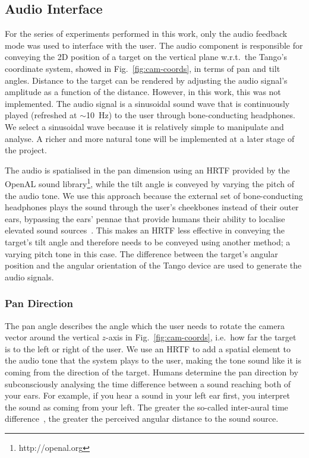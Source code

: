 \documentclass[sigconf, review=true, screen=true, anonymous=true]{acmart}
\begin{document}
\subsection{Audio Interface}

For the series of experiments performed in this work, only the audio feedback mode was used to interface with the user. The audio component is responsible for conveying the 2D position of a target on the vertical plane w.r.t.\ the Tango's coordinate system, showed in Fig.~\ref{fig:cam-coords}, in terms of pan and tilt angles. Distance to the target can be rendered by adjusting the audio signal's amplitude as a function of the distance. However, in this work, this was not implemented. The audio signal is a sinusoidal sound wave that is continuously played (refreshed at $\sim$\SI{10}{\hertz}) to the user through bone-conducting headphones. We select a sinusoidal wave because it is relatively simple to manipulate and analyse. A richer and more natural tone will be implemented at a later stage of the project. 

The audio is spatialised in the pan dimension using an HRTF provided by the OpenAL sound library\footnote{http://openal.org}, while the tilt angle is conveyed by varying the pitch of the audio tone. We use this approach because the external set of bone-conducting headphones plays the sound through the user's cheekbones instead of their outer ears, bypassing the ears' pennae that provide humans their ability to localise elevated sound sources~\cite{roffler1968factors, algazi2001elevation}. This makes an HRTF less effective in conveying the target's tilt angle and therefore needs to be conveyed using another method; a varying pitch tone in this case. The difference between the target's angular position and the angular orientation of the Tango device are used to generate the audio signals. 

\subsubsection{Pan Direction}

The pan angle describes the angle which the user needs to rotate the camera vector around the vertical $z$-axis in Fig.~\ref{fig:cam-coords}, i.e.\ how far the target is to the left or right of the user. We use an HRTF to add a spatial element to the audio tone that the system plays to the user, making the tone sound like it is coming from the direction of the target. Humans determine the pan direction by subconsciously analysing the time difference between a sound reaching both of your ears. For example, if you hear a sound in your left ear first, you interpret the sound as coming from your left. The greater the so-called inter-aural time difference~\cite{wightman1992dominant}, the greater the perceived angular distance to the sound source.
\end{document}
